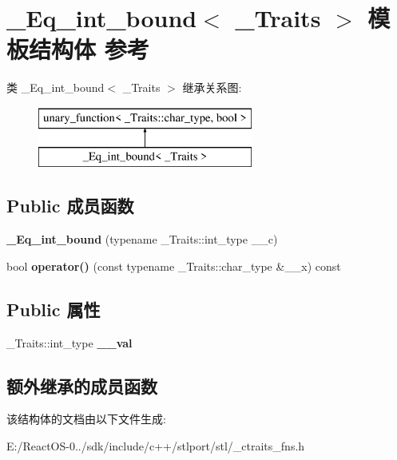 \hypertarget{struct___eq__int__bound}{}\section{\+\_\+\+Eq\+\_\+int\+\_\+bound$<$ \+\_\+\+Traits $>$ 模板结构体 参考}
\label{struct___eq__int__bound}
类 \+\_\+\+Eq\+\_\+int\+\_\+bound$<$ \+\_\+\+Traits $>$ 继承关系图\+:\begin{figure}[H]
\begin{center}
\leavevmode
\includegraphics[height=2.000000cm]{struct___eq__int__bound}
\end{center}
\end{figure}
\subsection*{Public 成员函数}
\begin{DoxyCompactItemize}
\item 
\mbox{\label{struct___eq__int__bound_a9dc3576596c1662f0cdd70520e81fc39}} 
{\bfseries \+\_\+\+Eq\+\_\+int\+\_\+bound} (typename \+\_\+\+Traits\+::int\+\_\+type \+\_\+\+\_\+c)
\item 
\mbox{\label{struct___eq__int__bound_adbeab6f3fc0ee42c251d6dfc69ce2f01}} 
bool {\bfseries operator()} (const typename \+\_\+\+Traits\+::char\+\_\+type \&\+\_\+\+\_\+x) const
\end{DoxyCompactItemize}
\subsection*{Public 属性}
\begin{DoxyCompactItemize}
\item 
\mbox{\label{struct___eq__int__bound_aa34683f74c1be7fcac962935d8b7dba9}} 
\+\_\+\+Traits\+::int\+\_\+type {\bfseries \+\_\+\+\_\+val}
\end{DoxyCompactItemize}
\subsection*{额外继承的成员函数}


该结构体的文档由以下文件生成\+:\begin{DoxyCompactItemize}
\item 
E\+:/\+React\+O\+S-\/0../sdk/include/c++/stlport/stl/\+\_\+ctraits\+\_\+fns.\+h\end{DoxyCompactItemize}

